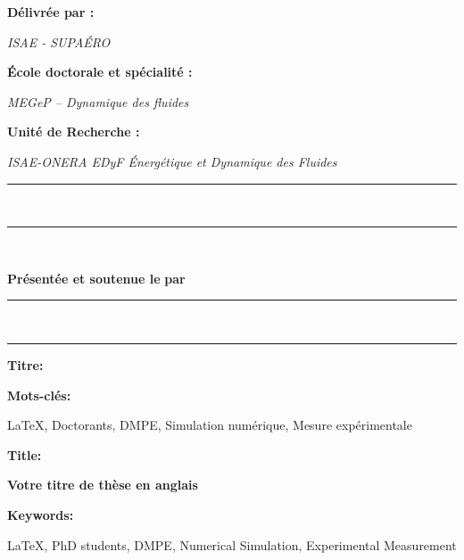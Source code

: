 {\vfill

{\parskip=0pt
{\raggedright\bfseries Délivrée par :} {\itshape ISAE - SUPAÉRO}

{\raggedright\bfseries École doctorale et spécialité :} {\itshape MEGeP -- Dynamique des fluides}

{\raggedright\bfseries Unité de Recherche :} {\itshape ISAE-ONERA EDyF Énergétique et Dynamique des Fluides}
}

{\raggedright\rule{\textwidth}{2.5pt}}\\[-2ex]
{\raggedright\rule{\textwidth}{1.2pt}}\\[-0.7cm]
\begin{center}
    {\bfseries {} Présentée et soutenue le} \textit{\theSoutenance} {\bfseries {} par } \textbf{\theAuteur}
\end{center}
\vspace*{-0.4cm}
{\raggedright\rule{\textwidth}{1.2pt}}\\[-1.6ex]
{\raggedright\rule{\textwidth}{2.5pt}}

\vfill


{\raggedright\bfseries\color{abscolor} Titre:} {\bfseries \theTitre}

\noindent \lipsum[1-2]

{\raggedright\bfseries\color{abscolor} Mots-clés:} LaTeX, Doctorants, DMPE, Simulation numérique, Mesure expérimentale


\vfill

\begin{center}
    \vspace{-10px}
    \color{abscolor}\underline{\hspace{5cm}}
\end{center}

\vfill


{\raggedright\bfseries\color{abscolor} Title:} {\bfseries Votre titre de thèse en anglais}

\noindent \lipsum[1-2]

{\raggedright\bfseries\color{abscolor} Keywords:} LaTeX, PhD students, DMPE, Numerical Simulation, Experimental Measurement

\vfill

\restoregeometry%
\pagestyle{headings}

}